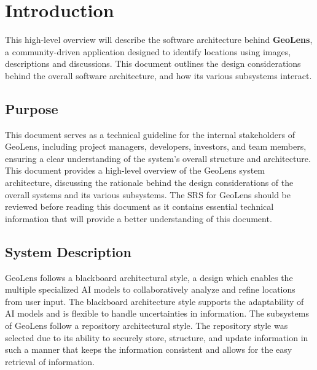 \documentclass[]{article}
\begin{document}
\newpage
\section{Introduction}
\label{sec:introduction}

This high-level overview will describe the software architecture behind \textbf{GeoLens}, a community-driven application designed to identify locations using images, descriptions and discussions. This document outlines the design considerations behind the overall software architecture, and how its various subsystems interact.  

\subsection{Purpose}
\label{sub:purpose}
This document serves as a technical guideline for the internal stakeholders of GeoLens, including project managers, developers, investors, and team members, ensuring a clear understanding of the system's overall structure and architecture. This document provides a high-level overview of the GeoLens system architecture, discussing the rationale behind the design considerations of the overall systems and its various subsystems. The SRS for GeoLens should be reviewed before reading this document as it contains essential technical information that will provide a better understanding of this document.%

\subsection{System Description}
\label{sub:system_description}
GeoLens follows a blackboard architectural style, a design which enables the multiple specialized AI models to collaboratively analyze and refine locations from user input. The blackboard architecture style supports the adaptability of AI models and is flexible to handle uncertainties in information. The subsystems of GeoLens follow a repository architectural style. The repository style was selected due to its ability to securely store, structure, and update information in such a manner that keeps the information consistent and allows for the easy retrieval of information. 

\end{document}
